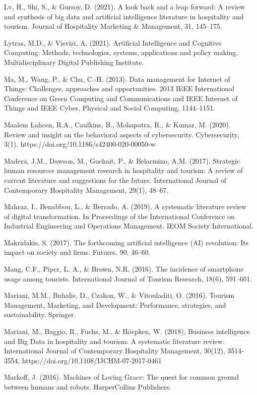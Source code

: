 \documentclass[
  letterpaper,
  DIV=11,
  numbers=noendperiod]{scrreprt}
\begin{document}
Lv, H., Shi, S., \& Gursoy, D. (2021). A look back and a leap forward: A
review and synthesis of big data and artificial intelligence literature
in hospitality and tourism. Journal of Hospitality Marketing \&
Management, 31, 145--175.

Lytras, M.D., \& Visvizi, A. (2021). Artificial Intelligence and
Cognitive Computing: Methods, technologies, systems, applications and
policy making. Multidisciplinary Digital Publishing Institute.

Ma, M., Wang, P., \& Chu, C.-H. (2013). Data management for Internet of
Things: Challenges, approaches and opportunities. 2013 IEEE
International Conference on Green Computing and Communications and IEEE
Internet of Things and IEEE Cyber, Physical and Social Computing,
1144--1151.

Maalem Lahcen, R.A., Caulkins, B., Mohapatra, R., \& Kumar, M. (2020).
Review and insight on the behavioral aspects of cybersecurity.
Cybersecurity, 3(1). https://doi.org/10.1186/s42400-020-00050-w

Madera, J.M., Dawson, M., Guchait, P., \& Belarmino, A.M. (2017).
Strategic human resources management research in hospitality and
tourism: A review of current literature and suggestions for the future.
International Journal of Contemporary Hospitality Management, 29(1),
48--67.

Mahraz, I., Benabbou, L., \& Berrado, A. (2019). A systematic literature
review of digital transformation. In Proceedings of the International
Conference on Industrial Engineering and Operations Management. IEOM
Society International.

Makridakis, S. (2017). The forthcoming artificial intelligence (AI)
revolution: Its impact on society and firms. Futures, 90, 46--60.

Mang, C.F., Piper, L. A., \& Brown, N.R. (2016). The incidence of
smartphone usage among tourists. International Journal of Tourism
Research, 18(6), 591--601.

Mariani, M.M., Buhalis, D., Czakon, W., \& Vitouladiti, O. (2016).
Tourism Management, Marketing, and Development: Performance, strategies,
and sustainability. Springer.

Mariani, M., Baggio, R., Fuchs, M., \& Höepken, W. (2018), Business
intelligence and Big Data in hospitality and tourism: A systematic
literature review. International Journal of Contemporary Hospitality
Management, 30(12), 3514-3554.
https://doi.org/10.1108/IJCHM-07-2017-0461

Markoff, J. (2016). Machines of Loving Grace: The quest for common
ground between humans and robots. HarperCollins Publishers.
\end{document}
